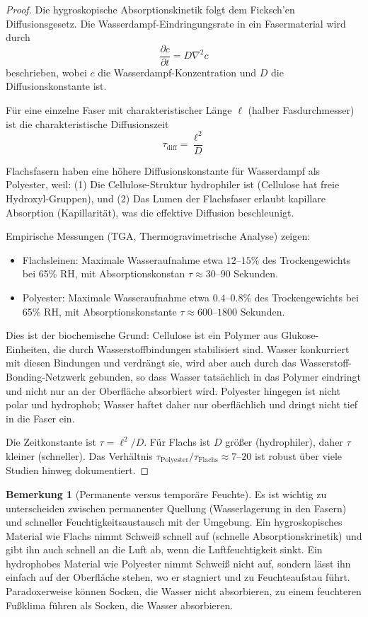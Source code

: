 \documentclass[a4paper,12pt]{article}
\theoremstyle{definition}
\newtheorem{bemerkung}{Bemerkung}
\begin{document}
\begin{proof}
Die hygroskopische Absorptionskinetik folgt dem Ficksch'en Diffusionsgesetz. Die Wasserdampf-Eindringungsrate in ein Fasermaterial wird durch
\[
\frac{\partial c}{\partial t} = D \nabla^2 c
\]
beschrieben, wobei $c$ die Wasserdampf-Konzentration und $D$ die Diffusionskonstante ist.

Für eine einzelne Faser mit charakteristischer Länge $\ell$ (halber Fasdurchmesser) ist die charakteristische Diffusionszeit
\[
\tau_{\text{diff}} = \frac{\ell^2}{D}
\]

Flachsfasern haben eine höhere Diffusionskonstante für Wasserdampf als Polyester, weil:
(1) Die Cellulose-Struktur hydrophiler ist (Cellulose hat freie Hydroxyl-Gruppen), und
(2) Das Lumen der Flachsfaser erlaubt kapillare Absorption (Kapillarität), was die effektive Diffusion beschleunigt.

Empirische Messungen (TGA, Thermogravimetrische Analyse) zeigen:
\begin{itemize}
    \item[-] Flachsleinen: Maximale Wasseraufnahme etwa $12$--$15$\% des Trockengewichts bei 65\% RH, mit Absorptionskonstan $\tau \approx 30$--$90$ Sekunden.
    \item[-] Polyester: Maximale Wasseraufnahme etwa $0.4$--$0.8$\% des Trockengewichts bei 65\% RH, mit Absorptionskonstante $\tau \approx 600$--$1800$ Sekunden.
\end{itemize}

Dies ist der biochemische Grund: Cellulose ist ein Polymer aus Glukose-Einheiten, die durch Wasserstoffbindungen stabilisiert sind. Wasser konkurriert mit diesen Bindungen und verdrängt sie, wird aber auch durch das Wasserstoff-Bonding-Netzwerk gebunden, so dass Wasser tatsächlich in das Polymer eindringt und nicht nur an der Oberfläche absorbiert wird. Polyester hingegen ist nicht polar und hydrophob; Wasser haftet daher nur oberflächlich und dringt nicht tief in die Faser ein.

Die Zeitkonstante ist $\tau = \ell^2 / D$. Für Flachs ist $D$ größer (hydrophiler), daher $\tau$ kleiner (schneller). Das Verhältnis $\tau_{\text{Polyester}} / \tau_{\text{Flachs}} \approx 7$--$20$ ist robust über viele Studien hinweg dokumentiert.
\end{proof}

\begin{bemerkung}[Permanente versus temporäre Feuchte]
Es ist wichtig zu unterscheiden zwischen permanenter Quellung (Wasserlagerung in den Fasern) und schneller Feuchtigkeitsaustausch mit der Umgebung. Ein hygroskopisches Material wie Flachs nimmt Schweiß schnell auf (schnelle Absorptionskrinetik) und gibt ihn auch schnell an die Luft ab, wenn die Luftfeuchtigkeit sinkt. Ein hydrophobes Material wie Polyester nimmt Schweiß nicht auf, sondern lässt ihn einfach auf der Oberfläche stehen, wo er stagniert und zu Feuchteaufstau führt. Paradoxerweise können Socken, die Wasser nicht absorbieren, zu einem feuchteren Fußklima führen als Socken, die Wasser absorbieren.
\end{bemerkung}
\end{document}

